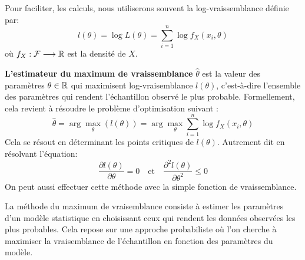\begin{proposition}
    Pour faciliter, les calculs, nous utiliserons souvent la log-vraissemblance définie par: 
        \[ l(\theta) = \log L(\theta) = \sum_{i=1}^{n} \log f_X(x_i, \theta) \] 
    où $f_X : \mathcal{F} \longrightarrow \mathbb{R}$ est la densité de $X$. 
\end{proposition}

\textbf{L'estimateur du maximum de vraissemblance} $\hat{\theta}$ est la valeur des paramètres $\theta \in \mathbb{R}$ qui maximisent 
log-vraisemblance $l(\theta)$, c'est-à-dire l'ensemble des paramètres qui rendent l'échantillon observé le plus probable.
Formellement, cela revient à résoudre le problème d'optimisation suivant :
    \[ \hat{\theta} = \arg \underset{\theta}{\max} (l(\theta)) = \arg \underset{\theta}{\max} \sum_{i=1}^{n} \log f_X(x_i, \theta) \] 
Cela se résout en déterminant les points critiques de $l(\theta)$. Autrement dit en résolvant l'équation: 
    \[ \frac{\partial l(\theta)}{\partial \theta} = 0 \quad \text{et} \quad \frac{\partial^2 l(\theta)}{\partial \theta^2} \leqslant 0 \] 
On peut aussi effectuer cette méthode avec la simple fonction de vraissemblance. 

\begin{remark}[Interprétation]
    La méthode du maximum de vraisemblance consiste à estimer les paramètres d'un modèle statistique 
    en choisissant ceux qui rendent les données observées les plus probables. 
    Cela repose sur une approche probabiliste où l'on cherche à maximiser la vraisemblance de l'échantillon 
    en fonction des paramètres du modèle.
\end{remark}

